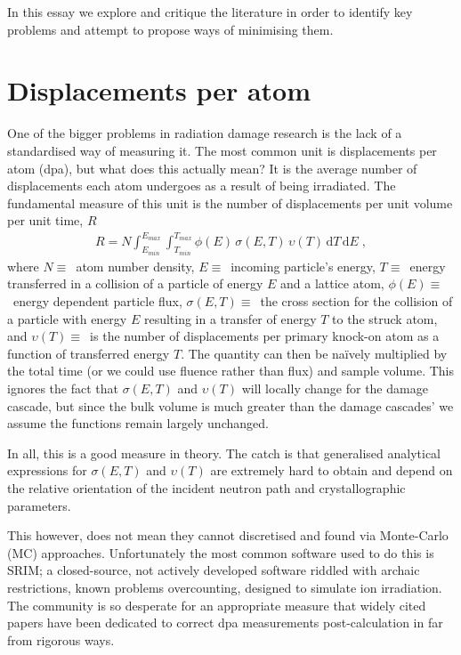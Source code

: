 \documentclass[12pt, a4paper]{article}
\begin{document}
		In this essay we explore and critique the literature in order to identify key problems and attempt to propose ways of minimising them.
		\section{Displacements per atom}\label{s:dpa}
		One of the bigger problems in radiation damage research is the lack of a standardised way of measuring it. The most common unit is displacements per atom (dpa), but what does this actually mean? It is the average number of displacements each atom undergoes as a result of being irradiated. The fundamental measure of this unit is the number of displacements per unit volume per unit time, $R$
		\begin{align}
			R=N\int _{E_{min}}^{E_{max}}\int _{T_{min}}^{T_{max}}\phi (E)\,\sigma (E,T)\,\upsilon (T)\,\mathrm{d}T\,\mathrm{d}E\;,
		\end{align}
		where $N \equiv$~atom number density, $E \equiv$~incoming particle's energy, $T \equiv$~energy transferred in a collision of a particle of energy $E$ and a lattice atom, $\phi (E) \equiv$~energy dependent particle flux, $\sigma (E,T) \equiv$~the cross section for the collision of a particle with energy $E$ resulting in a transfer of energy $T$ to the struck atom, and $\upsilon (T) \equiv$~is the number of displacements per primary knock-on atom as a function of transferred energy $T$. The quantity can then be na\"{i}vely multiplied by the total time (or we could use fluence rather than flux) and sample volume. This ignores the fact that $\sigma (E,T)$ and $\upsilon (T)$ will locally change for the damage cascade, but since the bulk volume is much greater than the damage cascades' we assume the functions remain largely unchanged.
		
		In all, this is a good measure in theory. The catch is that generalised analytical expressions for $\sigma (E,T)$ and $\upsilon (T)$ are extremely hard to obtain and depend on the relative orientation of the incident neutron path and crystallographic parameters.
		
		This however, does not mean they cannot discretised and found via Monte-Carlo (MC) approaches. Unfortunately the most common software used to do this is SRIM; a closed-source, not actively developed software riddled with archaic restrictions, known problems overcounting, designed to simulate ion irradiation. The community is so desperate for an appropriate measure that widely cited papers have been dedicated to correct dpa measurements post-calculation in far from rigorous ways.
		
\end{document}
